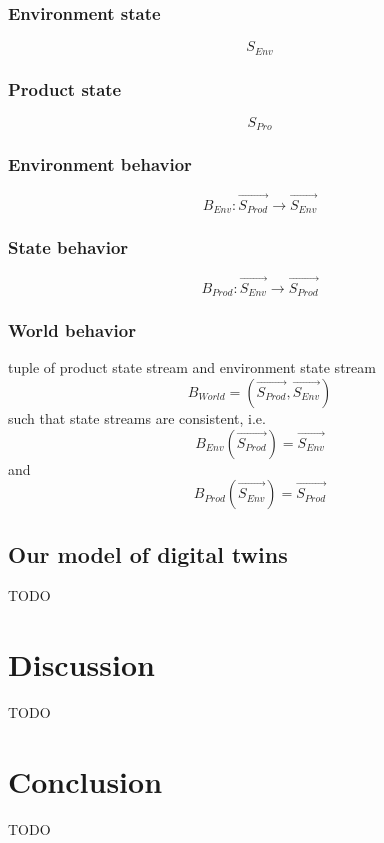 \documentclass[conference]{IEEEtran}
\begin{document}
    \subsubsection{Environment state}
    \[
        S_{Env}    
    \]

    \subsubsection{Product state}
    \[
        S_{Pro}    
    \]

    \subsubsection{Environment behavior}
    \[
        B_{Env}: \overrightarrow{S_{Prod}} \rightarrow \overrightarrow{S_{Env}}
    \]
    
    \subsubsection{State behavior}
    \[
        B_{Prod}: \overrightarrow{S_{Env}} \rightarrow \overrightarrow{S_{Prod}}
    \]

    \subsubsection{World behavior}
    tuple of product state stream and environment state stream
    \[
        B_{World} = (\overrightarrow{S_{Prod}}, \overrightarrow{S_{Env}})
    \]
    such that state streams are consistent, i.e.
    \[
        B_{Env}(\overrightarrow{S_{Prod}}) = \overrightarrow{S_{Env}}
    \]
    and
    \[
        B_{Prod}(\overrightarrow{S_{Env}}) = \overrightarrow{S_{Prod}}
    \]

    \subsection{Our model of digital twins}
    \label{section:theory-twin}
    TODO

    \section{Discussion}
    \label{section:discussion}
    TODO

    \section{Conclusion}
    \label{section:conclusion}
    TODO
    
    
    
    
\end{document}
